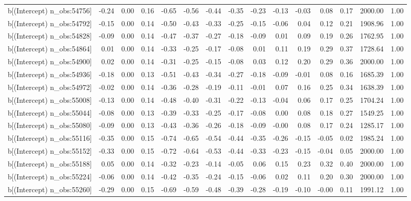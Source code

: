 \begin{table}[ht]
\begin{tabular}{rrrrrrrrrrrrrrr}
  b[(Intercept) n\_obs:54756] & -0.24 & 0.00 & 0.16 & -0.65 & -0.56 & -0.44 & -0.35 & -0.23 & -0.13 & -0.03 & 0.08 & 0.17 & 2000.00 & 1.00 \\ 
  b[(Intercept) n\_obs:54792] & -0.15 & 0.00 & 0.14 & -0.50 & -0.43 & -0.33 & -0.25 & -0.15 & -0.06 & 0.04 & 0.12 & 0.21 & 1908.96 & 1.00 \\ 
  b[(Intercept) n\_obs:54828] & -0.09 & 0.00 & 0.14 & -0.47 & -0.37 & -0.27 & -0.18 & -0.09 & 0.01 & 0.09 & 0.19 & 0.26 & 1762.95 & 1.00 \\ 
  b[(Intercept) n\_obs:54864] & 0.01 & 0.00 & 0.14 & -0.33 & -0.25 & -0.17 & -0.08 & 0.01 & 0.11 & 0.19 & 0.29 & 0.37 & 1728.64 & 1.00 \\ 
  b[(Intercept) n\_obs:54900] & 0.02 & 0.00 & 0.14 & -0.31 & -0.25 & -0.15 & -0.08 & 0.03 & 0.12 & 0.20 & 0.29 & 0.36 & 2000.00 & 1.00 \\ 
  b[(Intercept) n\_obs:54936] & -0.18 & 0.00 & 0.13 & -0.51 & -0.43 & -0.34 & -0.27 & -0.18 & -0.09 & -0.01 & 0.08 & 0.16 & 1685.39 & 1.00 \\ 
  b[(Intercept) n\_obs:54972] & -0.02 & 0.00 & 0.14 & -0.36 & -0.28 & -0.19 & -0.11 & -0.01 & 0.07 & 0.16 & 0.25 & 0.34 & 1638.39 & 1.00 \\ 
  b[(Intercept) n\_obs:55008] & -0.13 & 0.00 & 0.14 & -0.48 & -0.40 & -0.31 & -0.22 & -0.13 & -0.04 & 0.06 & 0.17 & 0.25 & 1704.24 & 1.00 \\ 
  b[(Intercept) n\_obs:55044] & -0.08 & 0.00 & 0.13 & -0.39 & -0.33 & -0.25 & -0.17 & -0.08 & 0.00 & 0.08 & 0.18 & 0.27 & 1549.25 & 1.00 \\ 
  b[(Intercept) n\_obs:55080] & -0.09 & 0.00 & 0.13 & -0.43 & -0.36 & -0.26 & -0.18 & -0.09 & -0.00 & 0.08 & 0.17 & 0.24 & 1285.17 & 1.00 \\ 
  b[(Intercept) n\_obs:55116] & -0.35 & 0.00 & 0.15 & -0.74 & -0.65 & -0.54 & -0.44 & -0.35 & -0.26 & -0.15 & -0.05 & 0.02 & 1985.24 & 1.00 \\ 
  b[(Intercept) n\_obs:55152] & -0.33 & 0.00 & 0.15 & -0.72 & -0.64 & -0.53 & -0.44 & -0.33 & -0.23 & -0.15 & -0.04 & 0.05 & 2000.00 & 1.00 \\ 
  b[(Intercept) n\_obs:55188] & 0.05 & 0.00 & 0.14 & -0.32 & -0.23 & -0.14 & -0.05 & 0.06 & 0.15 & 0.23 & 0.32 & 0.40 & 2000.00 & 1.00 \\ 
  b[(Intercept) n\_obs:55224] & -0.06 & 0.00 & 0.14 & -0.42 & -0.35 & -0.24 & -0.15 & -0.06 & 0.02 & 0.11 & 0.20 & 0.30 & 2000.00 & 1.00 \\ 
  b[(Intercept) n\_obs:55260] & -0.29 & 0.00 & 0.15 & -0.69 & -0.59 & -0.48 & -0.39 & -0.28 & -0.19 & -0.10 & -0.00 & 0.11 & 1991.12 & 1.00 \\ 

\end{tabular}
\end{table}
